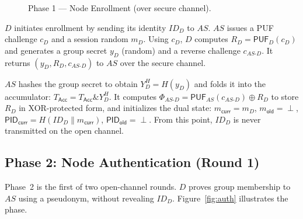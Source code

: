 \documentclass[conference]{IEEEtran}
\begin{document}
\begin{figure}[!t]
  \caption{Phase 1 — Node Enrollment (over secure channel).}
  \label{fig:enrollment}
\end{figure}

$D$ initiates enrollment by sending its identity $ID_D$ to $AS$.  $AS$
issues a PUF challenge $c_D$ and a session random $m_D$.  Using $c_D$, $D$
computes $R_D = \mathsf{PUF}_D(c_D)$ and generates a group secret $y_D$
(random) and a reverse challenge $c_{AS\text{-}D}$.  It returns
$(y_D, R_D, c_{AS\text{-}D})$ to $AS$ over the secure channel.

$AS$ hashes the group secret to obtain $Y_D^H = H(y_D)$ and folds it into
the accumulator: $T_\mathsf{Acc} = T_\mathsf{Acc} \mathbin{\&} Y_D^H$.
It computes $\Phi_{AS\text{-}D} = \mathsf{PUF}_{AS}(c_{AS\text{-}D}) \oplus
R_D$ to store $R_D$ in XOR-protected form, and initializes the dual state:
$m_\mathsf{curr} = m_D$, $m_\mathsf{old} = \perp$,
$\mathsf{PID}_\mathsf{curr} = H(ID_D \| m_\mathsf{curr})$,
$\mathsf{PID}_\mathsf{old} = \perp$.
From this point, $ID_D$ is never transmitted on the open channel.

\subsection{Phase 2: Node Authentication (Round 1)}

Phase~2 is the first of two open-channel rounds.  $D$ proves group
membership to $AS$ using a pseudonym, without revealing $ID_D$.
Figure~\ref{fig:auth} illustrates the phase.
\end{document}
